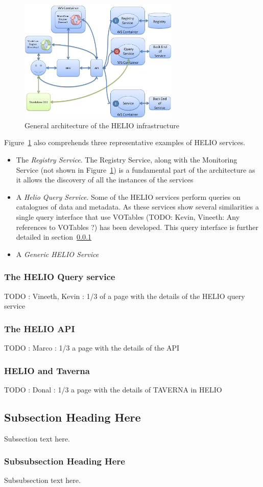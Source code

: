 \begin{figure}[!t]
\centering
\includegraphics[width=3in]{HELIO-Architecture-Detail.pdf}
\caption{General architecture of the HELIO infrastructure}
\label{arch.detail}
\end{figure}

Figure~\ref{arch.detail} also comprehends three representative examples of HELIO services. 

\begin{itemize}
\item{The \emph{Registry Service}. The Registry Service, along with the Monitoring Service (not shown in Figure~\ref{arch.detail}) is a fundamental part of the architecture as it allows the discovery of all the instances of the services}
\item{A \emph{Helio Query Service}. Some of the HELIO services perform queries on catalogues of data and metadata. As these services show several similarities a single query interface that use VOTables (TODO: Kevin, Vineeth: Any references to VOTables ?) has been developed. This query interface is further detailed in section~\ref{arch.queryservice}}
\item{A \emph{Generic HELIO Service}}
\end{itemize}

\subsubsection{The HELIO Query service}
\label{arch.queryservice}
TODO : Vineeth, Kevin : 1/3 of a page with the details of the HELIO query service

\subsubsection{The HELIO API}
\label{arch.api}
TODO : Marco : 1/3 a page with the details of the  API

\subsubsection{HELIO and Taverna}
\label{arch.taverna}
TODO : Donal : 1/3 a page with the details of TAVERNA in HELIO

\subsection{Subsection Heading Here}
Subsection text here.
\subsubsection{Subsubsection Heading Here}
Subsubsection text here.
